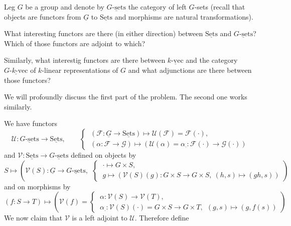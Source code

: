 \documentclass[11pt]{book}
\numberwithin{dummy}{section}
\theoremstyle{nonumberbreak}
\newenvironment{sol}[1][]{\ifthenelse{\equal{#1}{}}{\solution}{\solution[#1]}\rm}{\endsolution}
\newenvironment{prob}[1][]{\ifthenelse{\equal{#1}{}}{\problem}{\problem[#1]}\rm}{\endproblem}
\newcommand{\sets}{\underline{\mathrm{Sets}}}
\newcommand{\kvec}{\underline{k\textrm{-}\mathrm{vec}}}
\newcommand{\gsets}{\underline{G\textrm{-}\mathrm{sets}}}
\newcommand{\F}{\mathcal{F}}
\newcommand{\G}{\mathcal{G}}
\newcommand{\la}{\longrightarrow}
\begin{document}
\begin{spacing}{1.4}
\begin{prob}   %
Leg $G$ be a group and denote by $\underline{G\textrm{-}\mathrm{sets}}$ the category of left $G$-sets (recall that objects are functors from $\underline{G}$ to $\sets$ and morphisms are natural transformations).
\begin{compactenum}
\item What interesting functors are there (in either direction) between $\sets$ and $\underline{G\textrm{-}\mathrm{sets}}$? Which of those functors are adjoint to which?
\item Similarly, what interestig functors are there between $\kvec$ and the category $\underline{G\textrm{-}k\textrm{-}\mathrm{vec}}$ of $k$-linear representations of $G$ and what adjunctions are there between those functors?
\end{compactenum}
\begin{sol}
We will profoundly discuss the first part of the problem. The second one works similarly.
\begin{compactenum}
\item We have functors
$$\mathcal{U}: \gsets \la \sets, \qquad \begin{cases} \ (\F: \underline{G} \la \sets) \mapsto \mathcal{U}(\F)=\F(\cdot), \\ \ (\alpha: \F \la \G) \mapsto (\mathcal{U}(\alpha)= \alpha_{\cdot}: \F(\cdot) \la \G(\cdot)) \end{cases}$$
and $\mathcal{V}: \sets \la \gsets$ defined on objects by
$$ S \mapsto \left( \mathcal{V}(S): \underline{G} \la \gsets, \ \ \begin{cases} \ \cdot \mapsto G \times S, \\ \ g \mapsto \left(\mathcal{V}(S)(g): G \times S \la G \times S, \ (h,s) \mapsto (gh,s)\right) \end{cases}\right)$$
and on morphisms by 
$$(f: S \la T) \mapsto \left( \mathcal{V}(f) = \begin{cases} \ \alpha: \mathcal{V}(S) \la \mathcal{V}(T), \\ \ \alpha_.: \mathcal{V}(S)(\cdot) = G \times S \la G \times T, \ \ (g,s) \mapsto (g,f(s)) \end{cases} \right)$$
We now claim that $\mathcal{V}$ is a left adjoint to $\mathcal{U}$. Therefore define


\end{compactenum}
\end{sol}
\end{prob}
\end{spacing}
\end{document}
